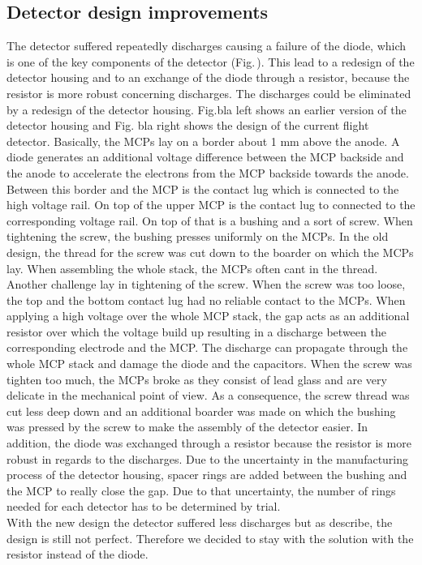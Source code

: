 			

		\subsection{Detector design improvements}\label{subsubsec:SetFacPumpst} %
		The detector suffered repeatedly discharges causing a failure of the diode, which is one of the key components of the detector (Fig.\,). This lead to a redesign of the detector housing and to an exchange of the diode through a resistor, because the resistor is more robust concerning discharges.
		The discharges could be eliminated by a redesign of the detector housing.
		Fig.bla left shows an earlier version of the detector housing and Fig. bla right shows the design of the current flight detector.
		Basically, the MCPs lay on a border about 1 mm above the anode. %
		A diode generates an additional voltage difference between the MCP backside and the anode to accelerate the electrons from the MCP backside towards the anode. Between this border and the MCP is the contact lug which is connected to the high voltage rail. On top of the upper MCP is the contact lug to connected to the corresponding voltage rail. On top of that is a bushing and a sort of screw. When tightening the screw, the bushing presses uniformly on the MCPs. In the old design, the thread for the screw was cut down to the boarder on which the MCPs lay. When assembling the whole stack, the MCPs often cant in the thread. Another challenge lay in tightening of the screw. When the screw was too loose, the top and the bottom contact lug had no reliable contact to the MCPs. When applying a high voltage over the whole MCP stack, the gap acts as an additional resistor over which the voltage build up resulting in a discharge between the corresponding electrode and the MCP. The discharge can propagate through the whole MCP stack and damage the diode and the capacitors. When the screw was tighten too much, the MCPs broke as they consist of lead glass and are very delicate in the mechanical point of view. As a consequence, the screw thread was cut less deep down and an additional boarder was made on which the bushing was pressed by the screw to make the assembly of the detector easier. In addition, the diode was exchanged through a resistor because the resistor is more robust in regards to the discharges. Due to the uncertainty in the manufacturing process of the detector housing, spacer rings are added between the bushing and the MCP to really close the gap. Due to that uncertainty, the number of rings needed for each detector has to be determined by trial.\\
		With the new design the detector suffered less discharges but as describe, the design is still not perfect. Therefore we decided to stay with the solution with the resistor instead of the diode.
		
